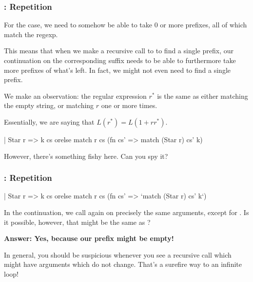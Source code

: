 \documentclass[aspectratio=169]{beamer}
\begin{document}
\begin{frame}[fragile]
  \frametitle{: Repetition}

  For the  case, we need to somehow be able to take 0 or more
  prefixes, all of which match the  regexp.

  \pause
  \vspace{\fill}

  This means that when we make a recursive call to  to find a single
  prefix, our continuation on the corresponding suffix needs to be able to
  furthermore take more prefixes of what's left. In fact, we might not even
  need to find a single prefix.

  \pause
  \vspace{\fill}

  We make an observation: the regular expression $r^*$ is the same as either
  matching the empty string, or matching $r$ one or more times.

  \pause
  \vspace{\fill}

  Essentially, we are saying that $L(r^*) = L(1 + rr^*)$.

  \begin{codeblock}
    | Star r =>
        k cs orelse match r cs (fn cs' => match (Star r) cs' k)
  \end{codeblock}

  \pause
  \vspace{\fill}

  However, there's something fishy here. Can you spy it?
\end{frame}

\begin{frame}[fragile]
  \frametitle{: Repetition}

  \begin{codeblock}
    | Star r =>
        k cs orelse match r cs (fn cs' => `match (Star r) cs' k`)
  \end{codeblock}

  \pause
  \vspace{\fill}

  In the continuation, we call  again on precisely the same
  arguments, except for . Is it possible, however, that
   might be the same as ?

  \pause
  \vspace{\fill}

  \textbf{Answer: Yes, because our prefix might be empty!}

  \pause
  \vspace{\fill}

  In general, you should be suspicious whenever you see a recursive call
  which might have arguments which do not change. That's a surefire way to
  an infinite loop!
\end{frame}
\end{document}
